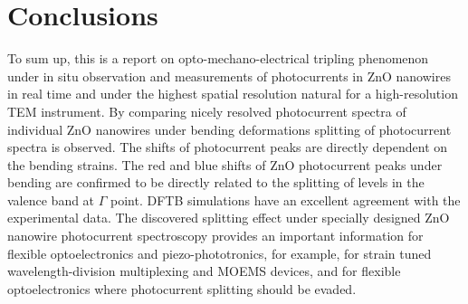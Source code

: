 \section{Conclusions}
To sum up, this is a report on opto-mechano-electrical tripling phenomenon under in situ observation and measurements of photocurrents in ZnO nanowires in real time and under the highest spatial resolution natural for a high-resolution TEM instrument. By comparing nicely resolved photocurrent spectra of individual ZnO nanowires under bending deformations splitting of photocurrent spectra is observed. The shifts of photocurrent peaks are directly dependent on the bending strains. The red and blue shifts of ZnO photocurrent peaks under bending are confirmed to be directly related to the splitting of levels in the valence band at $\Gamma$ point. DFTB simulations have an excellent agreement with the experimental data. The discovered splitting effect under specially designed ZnO nanowire photocurrent spectroscopy provides an important information for flexible optoelectronics and piezo-phototronics, for example, for strain tuned wavelength-division multiplexing and MOEMS devices, and for flexible optoelectronics where photocurrent splitting should be evaded. 